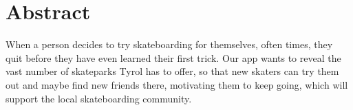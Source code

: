 \section*{Abstract}

When a person decides to try skateboarding for themselves, often times, they quit before they have even learned their first trick. Our app wants to reveal the vast number of skateparks Tyrol has to offer, so that new skaters can try them out and maybe find new friends there, motivating them to keep going, which will support the local skateboarding community.

\newpage